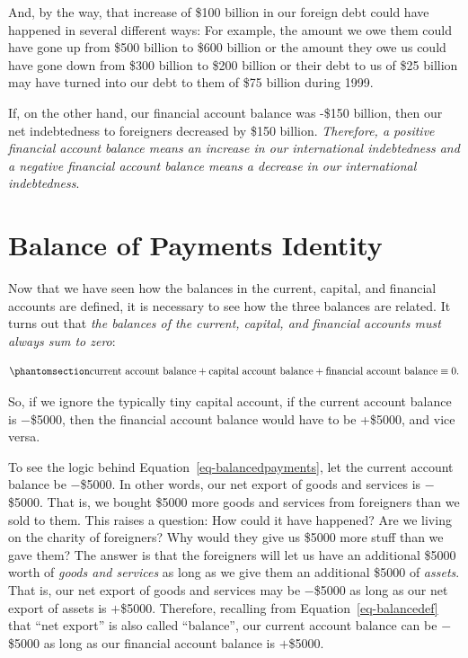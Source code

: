 \documentclass[
  letterpaper,
]{book}
\theoremstyle{plain}
\theoremstyle{remark}
\begin{document}
And, by the way, that increase of \$100 billion in our foreign debt
could have happened in several different ways: For example, the amount
we owe them could have gone up from \$500 billion to \$600 billion or
the amount they owe us could have gone down from \$300 billion to \$200
billion or their debt to us of \$25 billion may have turned into our
debt to them of \$75 billion during 1999.

If, on the other hand, our financial account balance was -\$150 billion,
then our net indebtedness to foreigners decreased by \$150 billion.
\emph{Therefore, a positive financial account balance means an increase
in our international indebtedness and a negative financial account
balance means a decrease in our international indebtedness}.

\section{Balance of Payments Identity}\label{sec-curcap}

Now that we have seen how the balances in the current, capital, and
financial accounts are defined, it is necessary to see how the three
balances are related. It turns out that \emph{the balances of the
current, capital, and financial accounts must always sum to zero}:

\begin{equation}\phantomsection\label{eq-balancedpayments}{
\text{current account balance} + \text{capital account balance} + \text{financial account balance} \equiv 0.
}\end{equation}

So, if we ignore the typically tiny capital account, if the current
account balance is \(-\)\$5000, then the financial account balance would
have to be +\$5000, and vice versa.

To see the logic behind Equation~\ref{eq-balancedpayments}, let the
current account balance be \(-\)\$5000. In other words, our net export
of goods and services is \(-\)\$5000. That is, we bought \$5000 more
goods and services from foreigners than we sold to them. This raises a
question: How could it have happened? Are we living on the charity of
foreigners? Why would they give us \$5000 more stuff than we gave them?
The answer is that the foreigners will let us have an additional \$5000
worth of \emph{goods and services} as long as we give them an additional
\$5000 of \emph{assets}. That is, our net export of goods and services
may be \(-\)\$5000 as long as our net export of assets is \(+\)\$5000.
Therefore, recalling from Equation~\ref{eq-balancedef} that ``net
export'' is also called ``balance'', our current account balance can be
\(-\)\$5000 as long as our financial account balance is \(+\)\$5000.
\end{document}
